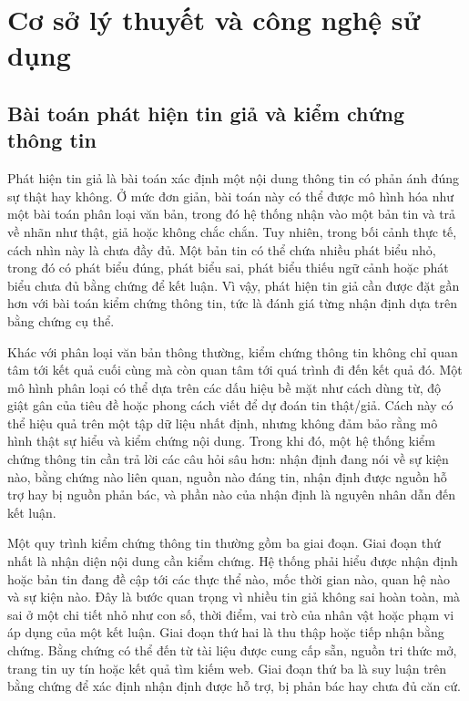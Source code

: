 ﻿\documentclass[oneside,a4paper,12pt]{extreport}
\begin{document}

\chapter{Cơ sở lý thuyết và công nghệ sử dụng}

\section{Bài toán phát hiện tin giả và kiểm chứng thông tin}

Phát hiện tin giả là bài toán xác định một nội dung thông tin có phản ánh đúng sự thật hay không. Ở mức đơn giản, bài toán này có thể được mô hình hóa như một bài toán phân loại văn bản, trong đó hệ thống nhận vào một bản tin và trả về nhãn như thật, giả hoặc không chắc chắn. Tuy nhiên, trong bối cảnh thực tế, cách nhìn này là chưa đầy đủ. Một bản tin có thể chứa nhiều phát biểu nhỏ, trong đó có phát biểu đúng, phát biểu sai, phát biểu thiếu ngữ cảnh hoặc phát biểu chưa đủ bằng chứng để kết luận. Vì vậy, phát hiện tin giả cần được đặt gần hơn với bài toán kiểm chứng thông tin, tức là đánh giá từng nhận định dựa trên bằng chứng cụ thể.

Khác với phân loại văn bản thông thường, kiểm chứng thông tin không chỉ quan tâm tới kết quả cuối cùng mà còn quan tâm tới quá trình đi đến kết quả đó. Một mô hình phân loại có thể dựa trên các dấu hiệu bề mặt như cách dùng từ, độ giật gân của tiêu đề hoặc phong cách viết để dự đoán tin thật/giả. Cách này có thể hiệu quả trên một tập dữ liệu nhất định, nhưng không đảm bảo rằng mô hình thật sự hiểu và kiểm chứng nội dung. Trong khi đó, một hệ thống kiểm chứng thông tin cần trả lời các câu hỏi sâu hơn: nhận định đang nói về sự kiện nào, bằng chứng nào liên quan, nguồn nào đáng tin, nhận định được nguồn hỗ trợ hay bị nguồn phản bác, và phần nào của nhận định là nguyên nhân dẫn đến kết luận.

Một quy trình kiểm chứng thông tin thường gồm ba giai đoạn. Giai đoạn thứ nhất là nhận diện nội dung cần kiểm chứng. Hệ thống phải hiểu được nhận định hoặc bản tin đang đề cập tới các thực thể nào, mốc thời gian nào, quan hệ nào và sự kiện nào. Đây là bước quan trọng vì nhiều tin giả không sai hoàn toàn, mà sai ở một chi tiết nhỏ như con số, thời điểm, vai trò của nhân vật hoặc phạm vi áp dụng của một kết luận. Giai đoạn thứ hai là thu thập hoặc tiếp nhận bằng chứng. Bằng chứng có thể đến từ tài liệu được cung cấp sẵn, nguồn tri thức mở, trang tin uy tín hoặc kết quả tìm kiếm web. Giai đoạn thứ ba là suy luận trên bằng chứng để xác định nhận định được hỗ trợ, bị phản bác hay chưa đủ căn cứ.
\end{document}
